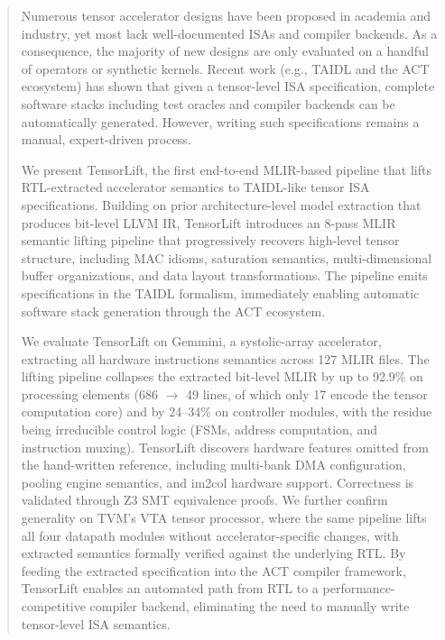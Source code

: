 \documentclass[sigconf]{acmart}
\begin{document}
\begin{abstract}

Numerous tensor accelerator designs have been proposed in academia and industry, yet most lack well-documented ISAs and compiler backends. As a consequence, the majority of new designs are only evaluated on a handful of operators or synthetic kernels. Recent work (e.g., TAIDL and the ACT ecosystem) has shown that given a tensor-level ISA specification, complete software stacks including test oracles and compiler backends can be automatically generated. However, writing such specifications remains a manual, expert-driven process.

We present TensorLift, the first end-to-end MLIR-based pipeline that lifts RTL-extracted accelerator semantics to TAIDL-like tensor ISA specifications. Building on prior architecture-level model extraction that produces bit-level LLVM IR, TensorLift introduces an 8-pass MLIR semantic lifting pipeline that progressively recovers high-level tensor structure, including MAC idioms, saturation semantics, multi-dimensional buffer organizations, and data layout transformations. The pipeline emits specifications in the TAIDL formalism, immediately enabling automatic software stack generation through the ACT ecosystem.

We evaluate TensorLift on Gemmini, a systolic-array accelerator, extracting all hardware instructions semantics across 127 MLIR files. The lifting pipeline collapses the extracted bit-level MLIR by up to 92.9\% on processing elements (686 $\to$ 49 lines, of which only 17 encode the tensor computation core) and by 24--34\% on controller modules, with the residue being irreducible control logic (FSMs, address computation, and instruction muxing). TensorLift discovers hardware features omitted from the hand-written reference, including multi-bank DMA configuration, pooling engine semantics, and im2col hardware support. Correctness is validated through Z3 SMT equivalence proofs. We further confirm generality on TVM's VTA tensor processor, where the same pipeline lifts all four datapath modules without accelerator-specific changes, with extracted semantics formally verified against the underlying RTL. By feeding the extracted specification into the ACT compiler framework, TensorLift enables an automated path from RTL to a performance-competitive compiler backend, eliminating the need to manually write tensor-level ISA semantics.
\end{abstract}

\end{document}
